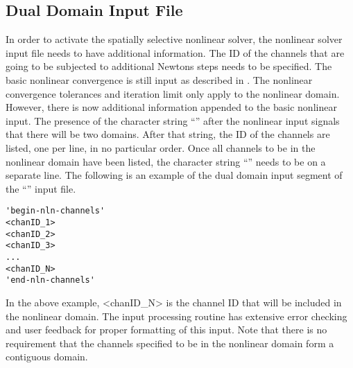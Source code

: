 \subsection{Dual Domain Input File}
\label{subsect:domDecompInputFile}

In order to activate the spatially selective nonlinear solver, the nonlinear solver input file needs to have additional information.
The ID of the channels that are going to be subjected to additional Newtons steps needs to be specified.
The basic nonlinear convergence is still input as described in .
The nonlinear convergence tolerances and iteration limit only apply to the nonlinear domain.
However, there is now additional information appended to the basic nonlinear input.
The presence of the character string ``'' after the nonlinear input signals that there will be two domains.
After that string, the ID of the channels are listed, one per line, in no particular order.
Once all channels to be in the nonlinear domain have been listed, the character string ``'' needs to be on a separate line.
The following is an example of the dual domain input segment of the ``'' input file.

{
\singlespace
\begin{verbatim}
'begin-nln-channels'
<chanID_1>
<chanID_2>
<chanID_3>
...
<chanID_N>
'end-nln-channels'
\end{verbatim}
}

In the above example, <chanID\_N> is the channel ID that will be included in the nonlinear domain.
The input processing routine has extensive error checking and user feedback for proper formatting of this input.
Note that there is no requirement that the channels specified to be in the nonlinear domain form a contiguous domain.


